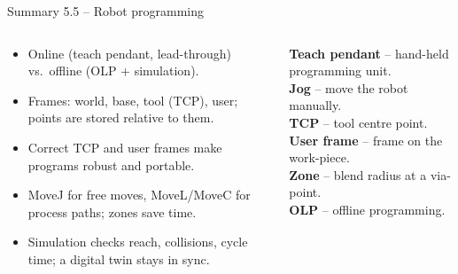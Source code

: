 \documentclass[aspectratio=169,10pt]{beamer}
\begin{document}
\begin{frame}{Summary 5.5 -- Robot programming}
\begin{columns}[T,onlytextwidth]
\begin{keybox}
\small
\begin{itemize}
\item Online (teach pendant, lead-through) vs.\ offline (OLP + simulation).
\item Frames: world, base, tool (TCP), user; points are stored relative to them.
\item Correct TCP and user frames make programs robust and portable.
\item MoveJ for free moves, MoveL/MoveC for process paths; zones save time.
\item Simulation checks reach, collisions, cycle time; a digital twin stays in sync.
\end{itemize}
\end{keybox}
\begin{defbox}
\small
\textbf{Teach pendant} -- hand-held programming unit.\\
\textbf{Jog} -- move the robot manually.\\
\textbf{TCP} -- tool centre point.\\
\textbf{User frame} -- frame on the work-piece.\\
\textbf{Zone} -- blend radius at a via-point.\\
\textbf{OLP} -- offline programming.
\end{defbox}
\end{columns}
\end{frame}

\end{document}
